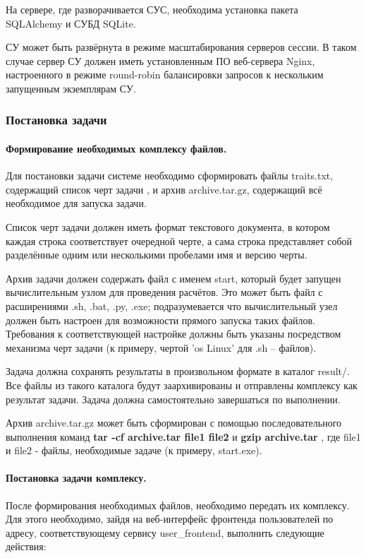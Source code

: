 \documentclass[a4paper,12pt]{report}
\numberwithin{equation}{section}
\begin{document}
  На сервере, где разворачивается СУС, необходима установка пакета \\ SQLAlchemy и СУБД SQLite.
  
  СУ может быть развёрнута в режиме масштабирования серверов сессии. 
  В таком случае сервер СУ должен иметь установленным ПО веб-сервера Nginx, настроенного в режиме round-robin балансировки запросов к нескольким запущенным экземплярам СУ.
  
  \subsubsection{Постановка задачи}
  \paragraph{Формирование необходимых комплексу файлов.}
  Для постановки задачи системе необходимо сформировать файлы traits.txt, содержащий список черт задачи
  , и архив archive.tar.gz, содержащий всё необходимое для запуска задачи.
  
  Список черт задачи должен иметь формат текстового документа, в котором каждая строка
  соответствует очередной черте, а сама строка представляет собой разделённые одним или несколькими пробелами имя и версию черты.
  
  Архив задачи должен содержать файл с именем start, который будет запущен вычислительным узлом для проведения расчётов.
  Это может быть файл с расширениями .sh, .bat, .py, .exe; подразумевается что вычислительный узел должен быть настроен для возможности прямого запуска таких файлов.
  Требования к соответствующей настройке должны быть указаны посредством механизма черт задачи (к примеру, чертой 'os Linux' для .sh -- файлов).
  
  Задача должна сохранять результаты в произвольном формате в каталог result/. 
  Все файлы из такого каталога будут заархивированы и отправлены комплексу как результат задачи.
  Задача должна самостоятельно завершаться по выполнении.
  
  Архив archive.tar.gz может быть сформирован с помощью последовательного выполнения команд
  \textbf{ tar -cf archive.tar file1 file2 } и 
  \textbf{ gzip archive.tar }
  , где file1 и file2 - файлы, необходимые задаче (к примеру, start.exe).
  
  \paragraph{Постановка задачи комплексу.}
  После формирования необходимых файлов, необходимо передать их комплексу.
  Для этого необходимо, зайдя на веб-интерфейс фронтенда пользователей по адресу, соответствующему сервису user\_frontend, выполнить следующие действия:
  
\end{document}
